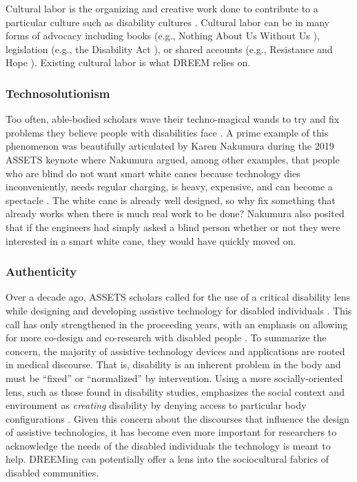 Cultural labor is the organizing and creative work done to contribute to a particular culture such as disability cultures \cite{charltonNothingUsUs2000}. Cultural labor can be in many forms of advocacy including books (e.g., Nothing About Us Without Us \cite{charltonNothingUsUs2000}), legislation (e.g., the Disability Act \cite{civilrightsdivisionAmericansDisabilitiesAct}), or shared accounts (e.g., Resistance and Hope \cite{wongResistanceHopeEssays2018}).  Existing cultural labor is what DREEM relies on. 

\subsubsection{Technosolutionism} \label{Technosoultionism}
Too often, able-bodied scholars wave their techno-magical wands to try and fix problems they believe people with disabilities face \cite{morozovEverythingClickHere2013,charltonNothingUsUs2000}. A prime example of this phenomenon was beautifully articulated by Karen Nakumura during the 2019 ASSETS keynote where Nakumura argued, among other examples, that people who are blind do not want smart white canes because technology dies inconveniently, needs regular charging, is heavy, expensive, and can become a spectacle \cite{nakamuraMyAlgorithmsHave2019}. The white cane is already well designed, so why fix something that already works when there is much real work to be done? Nakumura also posited that if the engineers had simply asked a blind person whether or not they were interested in a smart white cane, they would have quickly moved on.

\subsubsection{Authenticity} \label{authenticity}
Over a decade ago, ASSETS scholars called for the use of a critical disability lens while designing and developing assistive technology for disabled individuals \cite{mankoffDisabilityStudiesSource2010}. This call has only strengthened in the proceeding years, with an emphasis on allowing for more co-design and co-research with disabled people \cite{bennettPromiseEmpathyDesign2019,ymousAmJustTerrified2020,spielAgencyAutisticChildren2019}. To summarize the concern, the majority of assistive technology devices and applications are rooted in medical discourse. That is, disability is an inherent problem in the body and must be ``fixed'' or ``normalized'' by intervention. Using a more socially-oriented lens, such as those found in disability studies, emphasizes the social context and environment as \textit{creating} disability by denying access to particular body configurations \cite{ginsburgDisabilityWorlds2013,ringlandPlacePlayDis2019,titchkoskyQuestionAccessDisability2011}. Given this concern about the discourses that influence the design of assistive technologies, it has become even more important for researchers to acknowledge the needs of the disabled individuals the technology is meant to help. DREEMing can potentially offer a lens into the sociocultural fabrics of disabled communities.

